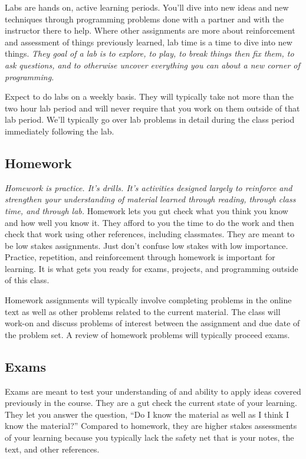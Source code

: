 \documentclass[10pt]{article}
\begin{document}
Labs are hands on, active learning periods. You'll dive into new ideas and new techniques
through programming problems done with a partner and with the instructor there to help.
Where other assignments are more about reinforcement and assessment of things previously learned,
lab time is a time to dive into new things. \textit{They goal of a lab is to explore, 
to play, to break things then fix them, to ask questions, and to otherwise uncover everything you
can about a new corner of programming.}

Expect to do labs on a weekly basis. They will typically take not more than the two hour lab period
and will never require that you work on them outside of that lab period. We'll typically go over
lab problems in detail during the class period immediately following the lab.

\subsection*{Homework}

\textit{Homework is practice. It's drills. It's activities designed largely to reinforce and strengthen
your understanding of material learned through reading, through class time, and through lab.}
Homework lets you gut check what you think you know and how well you know it. They afford to you the
time to do the work and then check that work using other references, including classmates. They are meant
to be low stakes assignments.  Just don't confuse low stakes with low importance. Practice,
repetition, and reinforcement through homework is important for learning. It is what gets you ready for
exams, projects, and programming outside of this class.

Homework assignments will typically involve completing problems in the online text as well as other
problems related to the current material. The class will work-on and discuss problems of interest between
the assignment and due date of the problem set. A review of homework problems will typically proceed exams.

\subsection*{Exams}

Exams are meant to test your understanding of and ability to apply ideas covered previously in the course.
They are a gut check the current state of your learning. They let you answer the question,
``Do I know the material as well as I think I know the material?''  Compared to homework, they are higher
stakes assessments of your learning because you typically lack the safety net that is your notes, the text,
and other references.
\end{document}
